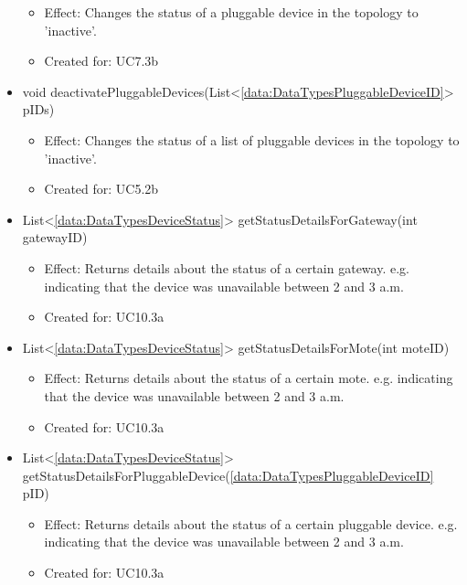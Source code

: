 \begin{description}
\begin{itemize}[noitemsep,nolistsep,leftmargin=-.25cm]
        \begin{itemize}[noitemsep,nolistsep]
           \item Effect: Changes the status of a pluggable device in the topology to 'inactive'.
\item Created for: UC7.3b
        \end{itemize}
      \item \textsf{void deactivatePluggableDevices(List\textless{}\ref{data:DataTypesPluggableDeviceID}\textgreater{} pIDs)}
        \begin{itemize}[noitemsep,nolistsep]
           \item Effect: Changes the status of a list of pluggable devices in the topology to 'inactive'.
\item Created for: UC5.2b
        \end{itemize}
      \item \textsf{List\textless{}\ref{data:DataTypesDeviceStatus}\textgreater{} getStatusDetailsForGateway(int gatewayID)}
        \begin{itemize}[noitemsep,nolistsep]
           \item Effect: Returns details about the status of a certain gateway. e.g. indicating that the device was unavailable between 2 and 3 a.m.
\item Created for: UC10.3a
        \end{itemize}
      \item \textsf{List\textless{}\ref{data:DataTypesDeviceStatus}\textgreater{} getStatusDetailsForMote(int moteID)}
        \begin{itemize}[noitemsep,nolistsep]
           \item Effect: Returns details about the status of a certain mote. e.g. indicating that the device was unavailable between 2 and 3 a.m.
\item Created for: UC10.3a
        \end{itemize}
      \item \textsf{List\textless{}\ref{data:DataTypesDeviceStatus}\textgreater{} getStatusDetailsForPluggableDevice(\ref{data:DataTypesPluggableDeviceID} pID)}
        \begin{itemize}[noitemsep,nolistsep]
           \item Effect: Returns details about the status of a certain pluggable device. e.g. indicating that the device was unavailable between 2 and 3 a.m.
\item Created for: UC10.3a
        \end{itemize}

\end{itemize}
\end{description}
